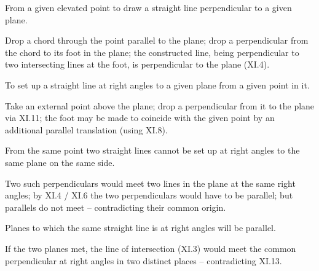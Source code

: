 \documentclass{rrxiv}
\begin{document}
\begin{claim}
\label{prop:XI.11}
From a given elevated point to draw a straight line perpendicular to
a given plane.
\end{claim}
\begin{evidence}[Proof of XI.11]
\label{ev:XI.11}
Drop a chord through the point parallel to the plane; drop a
perpendicular from the chord to its foot in the plane; the
constructed line, being perpendicular to two intersecting lines at
the foot, is perpendicular to the plane (XI.4).
\end{evidence}

\begin{claim}
\label{prop:XI.12}
To set up a straight line at right angles to a given plane from a
given point in it.
\end{claim}
\begin{evidence}[Proof of XI.12]
\label{ev:XI.12}
Take an external point above the plane; drop a perpendicular from it
to the plane via XI.11; the foot may be made to coincide with the
given point by an additional parallel translation (using XI.8).
\end{evidence}

\begin{claim}
\label{prop:XI.13}
From the same point two straight lines cannot be set up at right
angles to the same plane on the same side.
\end{claim}
\begin{evidence}[Proof of XI.13]
\label{ev:XI.13}
Two such perpendiculars would meet two lines in the plane at the
same right angles; by XI.4 / XI.6 the two perpendiculars would have
to be parallel; but parallels do not meet -- contradicting their
common origin.
\end{evidence}

\begin{claim}
\label{prop:XI.14}
Planes to which the same straight line is at right angles will be
parallel.
\end{claim}
\begin{evidence}[Proof of XI.14]
\label{ev:XI.14}
If the two planes met, the line of intersection (XI.3) would meet
the common perpendicular at right angles in two distinct places --
contradicting XI.13.
\end{evidence}
\end{document}
